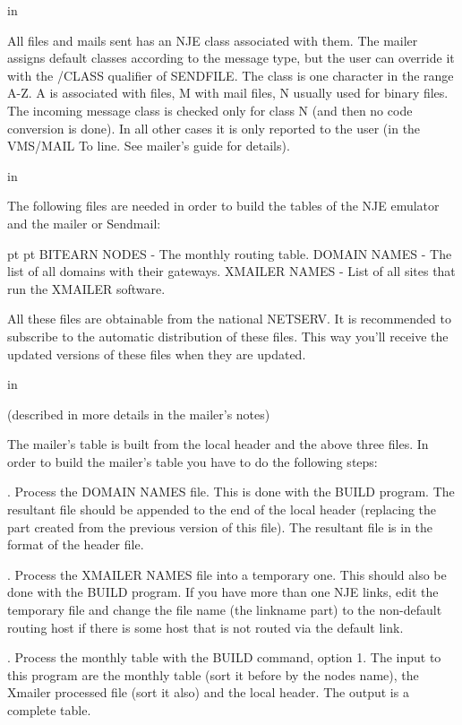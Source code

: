  in

All files and mails sent has an NJE class associated with  them.  The
mailer  assigns  default  classes according to the message type, but the
user can override it with the /CLASS qualifier of SENDFILE. The class is
one  character in the range A-Z. A is associated with files, M with mail
files, N usually used for binary files. The incoming  message  class  is
checked  only  for class N (and then no code conversion is done). In all
other cases it is only reported to the user (in the  VMS/MAIL  To  line.
See mailer's guide for details).

 in

The  following  files  are needed in order to build the tables of the
NJE emulator and the mailer or Sendmail:

{\obeylines\obeyspaces{} pt  pt
{\ncrBold BITEARN NODES} - The monthly routing table.
{\ncrBold DOMAIN NAMES} - The list of all domains with their gateways.
{\ncrBold XMAILER NAMES} - List of all sites that run the XMAILER software.
}

All these  files  are  obtainable  from  the  national  NETSERV.  It  is
recommended  to  subscribe to the automatic distribution of these files.
This way you'll receive the updated versions of these  files  when  they
are updated.

 in

(described in more details in the mailer's notes)

The mailer's table is built from the local header and the above three
files. In order to build the mailer's table you have to do the following
steps:

{. Process  the  DOMAIN NAMES file}. This is done with
the BUILD program.
The resultant file should be appended to the end of the local  header
(replacing the part created from the previous version of this file).
The resultant file is in the format of the header file.

{. Process the XMAILER NAMES file into a temporary one}.
This should also
be done with the BUILD program. If you have more than one NJE  links,
edit  the temporary file and change the file name (the linkname part)
to the non-default routing host if there is some  host  that  is  not
routed via the default link.

{. Process the monthly table with the BUILD comman}d, option 1.
The input
to this program are the monthly table (sort it before  by  the  nodes
name),  the  Xmailer  processed  file  (sort  it  also) and the local
header. The output is a complete table.

